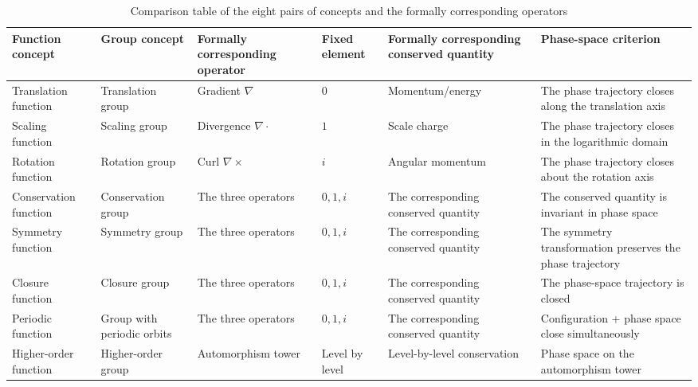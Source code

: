 \begin{table}[htbp]
    \centering
    \small
    \setlength{\tabcolsep}{3pt}
    \caption{Comparison table of the eight pairs of concepts and the formally corresponding operators}
    \label{tab:eight_concept_pairs}
    \begin{tabular}{>{\centering\arraybackslash}p{2.2cm}>{\centering\arraybackslash}p{2.2cm}>{\centering\arraybackslash}p{2cm}>{\centering\arraybackslash}p{2cm}>{\centering\arraybackslash}p{2.5cm}>{\centering\arraybackslash}p{2.5cm}}
        \toprule
        Function concept & Group concept & Formally corre\-sponding operator & Fixed element & Formally corre\-sponding conserved quantity & Phase-space criterion \\
        \midrule
        Translation function & Translation group & Gradient $\nabla$ & $0$ & Momentum/\allowbreak energy & The phase trajectory closes along the translation axis \\
        Scaling function & Scaling group & Divergence $\nabla\cdot$ & $1$ & Scale charge & The phase trajectory closes in the logarithmic domain \\
        Rotation function & Rotation group & Curl $\nabla\times$ & $i$ & Angular momentum & The phase trajectory closes about the rotation axis \\
        Conser\-vation function & Conser\-vation group & The three operators & $0,1,i$ & The corresponding conserved quantity & The conserved quantity is invariant in phase space \\
        Symmetry function & Symmetry group & The three operators & $0,1,i$ & The corresponding conserved quantity & The symmetry transformation preserves the phase trajectory \\
        Closure function & Closure group & The three operators & $0,1,i$ & The corresponding conserved quantity & The phase-space trajectory is closed \\
        Periodic function & Group with periodic orbits & The three operators & $0,1,i$ & The corresponding conserved quantity & Configu\-ration + phase space close simultaneously \\
        Higher-order function & Higher-order group & Auto\-morphism tower & Level by level & Level-by-level conservation & Phase space on the automorphism tower \\
        \bottomrule
    \end{tabular}
\end{table}

